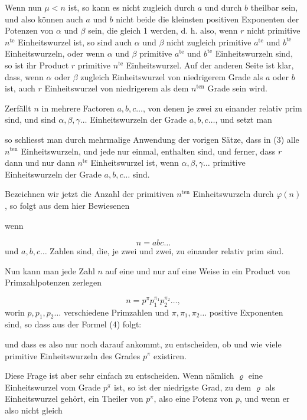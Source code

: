 Wenn nun $\mu < n$ ist, so kann es nicht zugleich durch $a$ und durch $b$ theilbar sein,
und also können auch $a$ und $b$ nicht beide die kleinsten positiven Exponenten der
Potenzen von $\alpha$ und $\beta$ sein, die gleich 1 werden, d. h. also, wenn $r$ nicht
primitive $n^{\mathrm{te}}$ Einheitswurzel ist, so sind auch $\alpha$ und $\beta$ nicht
zugleich primitive $a^{\mathrm{te}}$ und $b^{\mathrm{te}}$ Einheitswurzeln, oder wenn
$\alpha$ und $\beta$ primitive $a^{\mathrm{te}}$ und $b^{\mathrm{te}}$ Einheitswurzeln
sind, so ist ihr Product $r$ primitive $n^{\mathrm{te}}$ Einheitswurzel. Auf der anderen
Seite ist klar, dass, wenn $\alpha$ oder $\beta$ zugleich Einheitswurzel von niedrigerem
Grade als $a$ oder $b$ ist, auch $r$ Einheitswurzel von niedrigerem als dem
$n^{\mathrm{ten}}$ Grade sein wird.

Zerf\"allt $n$ in mehrere Factoren $a, b, c \ldots$, von denen je zwei zu einander
relativ prim sind, und sind $\alpha, \beta, \gamma \ldots$ Einheitswurzeln der Grade
$a, b, c \ldots$, und setzt man

so schliesst man durch mehrmalige Anwendung der vorigen S\"atze, dass in (3) alle
$n^{\mathrm{ten}}$ Einheitswurzeln, und jede nur einmal, enthalten sind, und ferner, dass
$r$ dann und nur dann  $n^{\mathrm{te}}$ Einheitswurzel ist, wenn
$\alpha, \beta, \gamma \ldots$ primitive Einheitswurzeln der Grade $a, b, c \ldots$ sind.

Bezeichnen wir jetzt die Anzahl der primitiven $n^{\mathrm{ten}}$ Einheitswurzeln durch
$\varphi(n)$, so folgt aus dem hier Bewiesenen

wenn

\[
n = abc \ldots
\]
und $a, b, c \ldots$ Zahlen sind, die, je zwei und zwei, zu einander relativ prim sind.

Nun kann man jede Zahl $n$ auf eine und nur auf eine Weise in ein Product von
Primzahlpotenzen zerlegen

\[
n = p^\pi p_1^{\pi_1} p_2^{\pi_2} \ldots,
\]
worin $p, p_1, p_2 \ldots$ verschiedene Primzahlen und $\pi, \pi_1, \pi_2 \ldots$
positive Exponenten sind, so dass aus der Formel (4) folgt:

und dass es also nur noch darauf ankommt, zu entscheiden, ob und wie viele primitive
Einheitswurzeln des Grades $p^\pi$ existiren.

Diese Frage ist aber sehr einfach zu entscheiden. Wenn nämlich $\varrho$ eine
Einheitswurzel vom Grade $p^\pi$ ist, so ist der niedrigste Grad, zu dem $\varrho$ als
Einheitswurzel geh\"ort, ein Theiler von $p^\pi$, also eine Potenz von $p$, und wenn er
also nicht gleich
